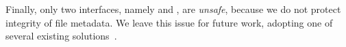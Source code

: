 Finally, only two interfaces, namely  and , are {\em unsafe}, because we do not protect
integrity of file metadata.  We leave this issue
for future work, adopting one of several existing solutions~\cite{inktag}.


\begin{comment}
\begin{edits}
The justification of the safety of \graphenesgx{}'s enclave interface is as follows: 
(1) our enclave interface contains only \enclavecallnum{} functions, with only the simplest semantics and minimal corner cases, so is much easier to check than a significant portion of the Linux system call table or POSIX API. (2) for majority of these \enclavecallnum{} functions, the shielding library can either predict a single value that the OS is allowed to return, or completely dismiss any return values from the OS.
\end{edits}
\end{comment}
 









